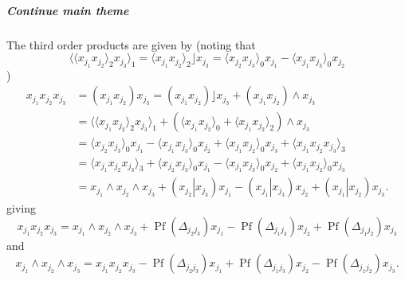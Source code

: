 \documentclass[aps, preprint]{revtex4}
\begin{document}
\subparagraph{Continue main theme}
The third order products are given by (noting that
\begin{equation} \langle  \langle x_{j_{1}} x_{j_{2}} \rangle _{2} x_{j_{3}} \rangle _{1} = \langle x_{j_{1}} x_{j_{2}} \rangle _{2}\rfloor x_{j_{3}} = \langle x_{j_{2}} x_{j_{3}} \rangle _{0} x_{j_{1}} - \langle x_{j_{1}} x_{j_{3}} \rangle _{0} x_{j_{2}}
\end{equation})
\begin{align}x_{j_{1}} x_{j_{2}} x_{j_{3}} &  =\left (x_{j_{1}} x_{j_{2}}\right ) x_{j_{3}} =\left (x_{j_{1}} x_{j_{2}}\right )\rfloor x_{j_{3}} +\left (x_{j_{1}} x_{j_{2}}\right ) \wedge x_{j_{3}} \nonumber  \\
 &  = \langle  \langle x_{j_{1}} x_{j_{2}} \rangle _{2} x_{j_{3}} \rangle _{1} +\left ( \langle x_{j_{1}} x_{j_{2}} \rangle _{0} + \langle x_{j_{1}} x_{j_{2}} \rangle _{2}\right ) \wedge x_{j_{3}} \nonumber  \\
 &  = \langle x_{j_{2}} x_{j_{3}} \rangle _{0} x_{j_{1}} - \langle x_{j_{1}} x_{j_{3}} \rangle _{0} x_{j_{2}} + \langle x_{j_{1}} x_{j_{2}} \rangle _{0} x_{j_{3}} + \langle x_{j_{1}} x_{j_{2}} x_{j_{3}} \rangle _{3} \nonumber  \\
 &  = \langle x_{j_{1}} x_{j_{2}} x_{j_{3}} \rangle _{3} + \langle x_{j_{2}} x_{j_{3}} \rangle _{0} x_{j_{1}} - \langle x_{j_{1}} x_{j_{3}} \rangle _{0} x_{j_{2}} + \langle x_{j_{1}} x_{j_{2}} \rangle _{0} x_{j_{3}} \nonumber  \\
 &  =x_{j_{1}} \wedge x_{j_{2}} \wedge x_{j_{3}} +\left (\left .x_{j_{2}}\right \vert x_{j_{3}}\right ) x_{j_{1}} -\left (\left .x_{j_{1}}\right \vert x_{j_{3}}\right ) x_{j_{2}} +\left (\left .x_{j_{1}}\right \vert x_{j_{2}}\right ) x_{j_{3}}\text{.}\end{align}giving
\begin{equation}x_{j_{1}} x_{j_{2}} x_{j_{3}} =x_{j_{1}} \wedge x_{j_{2}} \wedge x_{j_{3}} +\ensuremath{\operatorname*{Pf}} \left ( \Delta _{j_{2} j_{3}}\right ) x_{j_{1}} -\ensuremath{\operatorname*{Pf}} \left ( \Delta _{j_{1} j_{3}}\right ) x_{j_{2}} +\ensuremath{\operatorname*{Pf}} \left ( \Delta _{j_{1} j_{2}}\right ) x_{j_{3}}
\end{equation}and
\begin{equation}x_{j_{1}} \wedge x_{j_{2}} \wedge x_{j_{3}} =x_{j_{1}} x_{j_{2}} x_{j_{3}} -\ensuremath{\operatorname*{Pf}} \left ( \Delta _{j_{2} j_{3}}\right ) x_{j_{1}} +\ensuremath{\operatorname*{Pf}} \left ( \Delta _{j_{1} j_{3}}\right ) x_{j_{2}} -\ensuremath{\operatorname*{Pf}} \left ( \Delta _{j_{1} j_{2}}\right ) x_{j_{3}}\text{.}
\end{equation}
\end{document}

